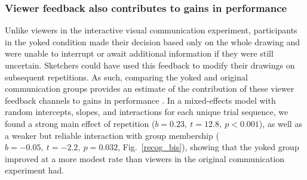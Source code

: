 
\subsubsection{Viewer feedback also contributes to gains in performance}

Unlike viewers in the interactive visual communication experiment, participants in the yoked condition made their decision based only on the whole drawing and were unable to interrupt or await additional information if they were still uncertain.
Sketchers could have used this feedback to modify their drawings on subsequent repetitions.
As such, comparing the yoked and original communication groups provides an estimate of the contribution of these viewer feedback channels to gains in performance \cite{SchoberClark89_Overhearers}.
In a mixed-effects model with random intercepts, slopes, and interactions for each unique trial sequence, we found a %
strong main effect of repetition ($b = 0.23, ~t = 12.8,~p < 0.001$), as well as a weaker but reliable interaction with group membership ($b = -0.05, ~t = -2.2, ~p = 0.032$, Fig.~\ref{recog_bis}), showing that the yoked group improved at a more modest rate than viewers in the original communication experiment had.

